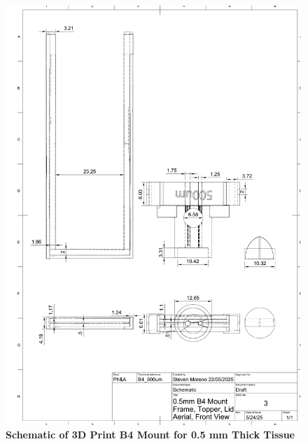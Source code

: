     \begin{figure}[H]
        \centering
        \includegraphics[width=1\linewidth]{Figures/0.5mmB4Schematic.pdf}
        \caption{\textbf{Schematic of 3D Print B4 Mount for 0.5 mm Thick Tissue}}
        \label{fig:enter-label}
    \end{figure}
    
